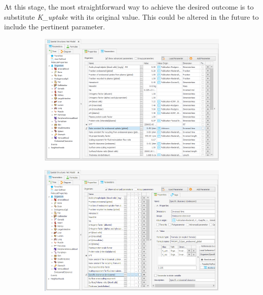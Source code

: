 \documentclass[fleqn,10pt]{physiome}
\begin{document}
At this stage, the most straightforward way to achieve the desired outcome is to substitute \textit{K\_uptake} with its original value. This could be altered in the future to include the pertinent parameter.

\begin{figure}[htb]\centering
    \begin{subfigure}{0.49\textwidth}
        \includegraphics[width=\textwidth]{Picture8.png}
        \caption{}
        \label{pic:4a}
    \end{subfigure}
    \hfill
    \begin{subfigure}{0.49\textwidth}
        \includegraphics[width=\textwidth]{Picture9.png}
        \caption{}
        \label{pic:4b}
    \end{subfigure}
    \hfill
    \begin{subfigure}{0.49\textwidth}

\end{subfigure}
\end{figure}
\end{document}
